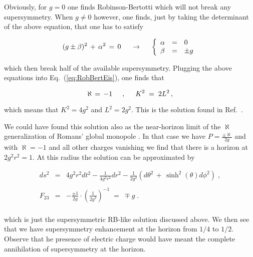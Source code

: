 \documentclass[12pt,a4paper]{article}
\begin{document}
Obviously, for $g=0$ one finds Robinson-Bertotti which will not break
any supersymmetry. When $g\neq 0$ however, one finds, just by taking 
the determinant of the above equation, that one has to satisfy

\begin{equation}
(g\pm\beta )^{2}\,+\,\alpha^{2} \,=\, 0 
   \hspace{.5cm}\rightarrow\hspace{.5cm}
\left\{
\begin{array}{lcl}
\alpha &=& 0  \\
\beta  &=& \pm g
\end{array}
\right.
\end{equation}

\noindent which then break half of the available supersymmetry. 
Plugging the above equations into Eq.~(\ref{eq:RobBertEis}), one finds
that

\begin{equation}
\aleph \,=\, -1 \hspace{.5cm},\hspace{.5cm}
K^{2} \;=\; 2 L^{2}\, ,
\end{equation}

\noindent which  means that $K^{2}=4g^{2}$ and $L^{2}=2g^{2}$. This is 
 the solution found in Ref.~\cite{kn:CKZ}. 

We could have found this solution also as the near-horizon limit of 
the $\aleph$ generalization of Romans' global monopole \cite{art:Ro}. In that 
case we have $P=\textstyle{\frac{\pm\aleph}{2g}}$ and with $\aleph =-1$
and all other charges vanishing  we find that there is a horizon 
at $2g^{2}r^{2}=1$. At this radius the solution can be approximated by

\begin{equation}
\begin{array}{rcl}
ds^{2} &=& 4g^{2}r^{2}dt^{2}-\frac{1}{4g^{2}r^{2}}dr^{2}
           -\frac{1}{2g^{2}}\left(
               d\theta^{2}\,+\, \sinh^{2}(\theta )d\phi^{2}
           \right) \; , \\
& & \\
F_{23} &=& -\frac{\pm 1}{2g}\cdot \left(\frac{1}{2g^{2}} \right)^{-1}
       \;=\; \mp g \; .\\
\end{array}
\end{equation}

\noindent which is just the supersymmetric RB-like solution discussed above.
We then see that we have supersymmetry enhancement at the horizon from
$1/4$ to $1/2$. Observe that he presence of  electric charge would have
meant the complete annihilation of supersymmetry at the horizon.
\end{document}
